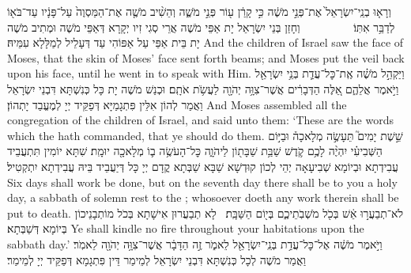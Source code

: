 {וְרָא֤וּ בְנֵֽי־יִשְׂרָאֵל֙ אֶת־פְּנֵ֣י מֹשֶׁ֔ה כִּ֣י קָרַ֔ן ע֖וֹר פְּנֵ֣י מֹשֶׁ֑ה וְהֵשִׁ֨יב מֹשֶׁ֤ה אֶת־הַמַּסְוֶה֙ עַל־פָּנָ֔יו עַד־בֹּא֖וֹ לְדַבֵּ֥ר אִתּֽוֹ׃ \setuma         
}
{וְחָזַן בְּנֵי יִשְׂרָאֵל יָת אַפֵּי מֹשֶׁה אֲרֵי סְגִי זִיו יְקָרָא דְּאַפֵּי מֹשֶׁה וּמְתִיב מֹשֶׁה יָת בֵּית אַפֵּי עַל אַפּוֹהִי עַד דְּעָלֵיל לְמַלָּלָא עִמֵּיהּ׃}
{And the children of Israel saw the face of Moses, that the skin of Moses’ face sent forth beams; and Moses put the veil back upon his face, until he went in to speak with Him.}{}
\newperek
{}
{וַיַּקְהֵ֣ל מֹשֶׁ֗ה אֶֽת־כׇּל־עֲדַ֛ת בְּנֵ֥י יִשְׂרָאֵ֖ל וַיֹּ֣אמֶר אֲלֵהֶ֑ם אֵ֚לֶּה הַדְּבָרִ֔ים אֲשֶׁר־צִוָּ֥ה יְהֹוָ֖ה לַעֲשֹׂ֥ת אֹתָֽם׃
}
{וּכְנַשׁ מֹשֶׁה יָת כָּל כְּנִשְׁתָּא דִּבְנֵי יִשְׂרָאֵל וַאֲמַר לְהוֹן אִלֵּין פִּתְגָמַיָּא דְּפַקֵּיד יְיָ לְמֶעֱבַד יָתְהוֹן׃}
{And Moses assembled all the congregation of the children of Israel, and said unto them: ‘These are the words which the \lord\space hath commanded, that ye should do them.}{}
{שֵׁ֣שֶׁת יָמִים֮ תֵּעָשֶׂ֣ה מְלָאכָה֒ וּבַיּ֣וֹם הַשְּׁבִיעִ֗י יִהְיֶ֨ה לָכֶ֥ם קֹ֛דֶשׁ שַׁבַּ֥ת שַׁבָּת֖וֹן לַיהֹוָ֑ה כׇּל־הָעֹשֶׂ֥ה ב֛וֹ מְלָאכָ֖ה יוּמָֽת׃
}
{שִׁתָּא יוֹמִין תִּתְעֲבֵיד עֲבִידְתָא וּבְיוֹמָא שְׁבִיעָאָה יְהֵי לְכוֹן קוּדְשָׁא שַׁבָּא שַׁבְּתָא קֳדָם יְיָ כָּל דְּיַעֲבֵיד בֵּיהּ עֲבִידְתָא יִתְקְטִיל׃}
{Six days shall work be done, but on the seventh day there shall be to you a holy day, a sabbath of solemn rest to the \lord; whosoever doeth any work therein shall be put to death.}{}
{לֹא־תְבַעֲר֣וּ אֵ֔שׁ בְּכֹ֖ל מֹשְׁבֹֽתֵיכֶ֑ם בְּי֖וֹם הַשַּׁבָּֽת׃ \petucha 
{}}
{לָא תְבַעֲרוּן אִישָׁתָא בְּכֹל מוֹתְבָנֵיכוֹן בְּיוֹמָא דְּשַׁבְּתָא׃}
{Ye shall kindle no fire throughout your habitations upon the sabbath day.’}{}
{וַיֹּ֣אמֶר מֹשֶׁ֔ה אֶל־כׇּל־עֲדַ֥ת בְּנֵֽי־יִשְׂרָאֵ֖ל לֵאמֹ֑ר זֶ֣ה הַדָּבָ֔ר אֲשֶׁר־צִוָּ֥ה יְהֹוָ֖ה לֵאמֹֽר׃
}
{וַאֲמַר מֹשֶׁה לְכָל כְּנִשְׁתָּא דִּבְנֵי יִשְׂרָאֵל לְמֵימַר דֵּין פִּתְגָמָא דְּפַקֵּיד יְיָ לְמֵימַר׃}
